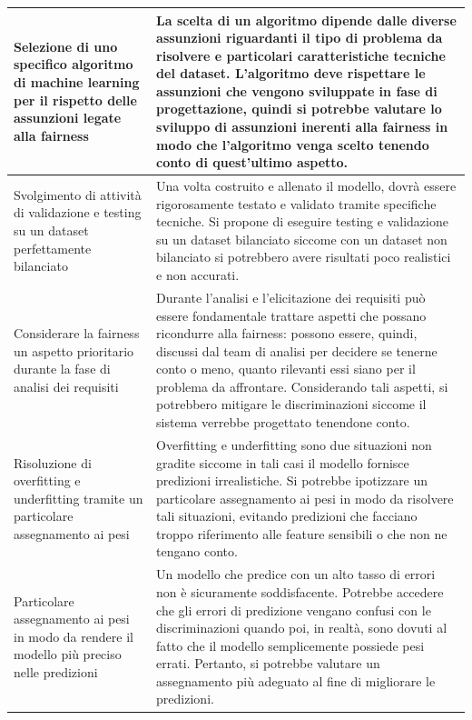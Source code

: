 \begin{longtable}{| p{} | p{} |}
    \\ \hline
    Selezione di uno specifico algoritmo di machine learning per il rispetto delle assunzioni legate alla fairness
    &
    La scelta di un algoritmo dipende dalle diverse assunzioni riguardanti il tipo di problema da risolvere e particolari caratteristiche tecniche del dataset. L'algoritmo deve rispettare le assunzioni che vengono sviluppate in fase di progettazione, quindi si potrebbe valutare lo sviluppo di assunzioni inerenti alla fairness in modo che l'algoritmo venga scelto tenendo conto di quest'ultimo aspetto.
    \\ \hline
    \rowcolor{Gray!30}
    Svolgimento di attività di validazione e testing su un dataset perfettamente bilanciato
    &
    Una volta costruito e allenato il modello, dovrà essere rigorosamente testato e validato tramite specifiche tecniche. Si propone di eseguire testing e validazione su un dataset bilanciato siccome con un dataset non bilanciato si potrebbero avere risultati poco realistici e non accurati.
     \\ \hline
    Considerare la fairness un aspetto prioritario durante la fase di analisi dei requisiti
    &
    Durante l'analisi e l'elicitazione dei requisiti può essere fondamentale trattare aspetti che possano ricondurre alla fairness: possono essere, quindi, discussi dal team di analisi per decidere se tenerne conto o meno, quanto rilevanti essi siano per il problema da affrontare. Considerando tali aspetti, si potrebbero mitigare le discriminazioni siccome il sistema verrebbe progettato tenendone conto.
    \\ \hline
    \rowcolor{Gray!30}
    Risoluzione di overfitting e underfitting tramite un particolare assegnamento ai pesi
    &
    Overfitting e underfitting sono due situazioni non gradite siccome in tali casi il modello fornisce predizioni irrealistiche. Si potrebbe ipotizzare un particolare assegnamento ai pesi in modo da risolvere tali situazioni, evitando predizioni che facciano troppo riferimento alle feature sensibili o che non ne tengano conto.
    \\ \hline
    Particolare assegnamento ai pesi in modo da rendere il modello più preciso nelle predizioni
    &
    Un modello che predice con un alto tasso di errori non è sicuramente soddisfacente. Potrebbe accedere che gli errori di predizione vengano confusi con le discriminazioni quando poi, in realtà, sono dovuti al fatto che il modello semplicemente possiede pesi errati. Pertanto, si potrebbe valutare un assegnamento più adeguato al fine di migliorare le predizioni.

\end{longtable}
